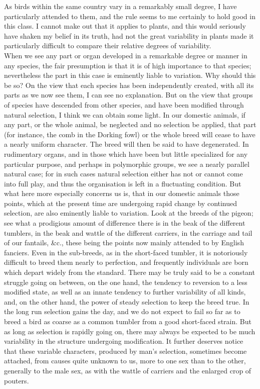 \indent As birds within the same country vary in a remarkably small degree, I have particularly attended to them, and the rule seems to me certainly to hold good in this class. I cannot make out that it applies to plants, and this would seriously have shaken my belief in its truth, had not the great variability in plants made it particularly difficult to compare their relative degrees of variability.\\
\indent When we see any part or organ developed in a remarkable degree or manner in any species, the fair presumption is that it is of high importance to that species; nevertheless the part in this case is eminently liable to variation. Why should this be so? On the view that each species has been independently created, with all its parts as we now see them, I can see no explanation. But on the view that groups of species have descended from other species, and have been modified through natural selection, I think we can obtain some light. In our domestic animals, if any part, or the whole animal, be neglected and no selection be applied, that part (for instance, the comb in the Dorking fowl) or the whole breed will cease to have a nearly uniform character. The breed will then be said to have degenerated. In rudimentary organs, and in those which have been but little specialized for any particular purpose, and perhaps in polymorphic groups, we see a nearly parallel natural case; for in such cases natural selection either has not or cannot come into full play, and thus the organisation is left in a fluctuating condition. But what here more especially concerns us is, that in our domestic animals those points, which at the present time are undergoing rapid change by continued selection, are also eminently liable to variation. Look at the breeds of the pigeon; see what a prodigious amount of difference there is in the beak of the different tumblers, in the beak and wattle of the different carriers, in the carriage and tail of our fantails, \&c., these being the points now mainly attended to by English fanciers. Even in the sub-breeds, as in the short-faced tumbler, it is notoriously difficult to breed them nearly to perfection, and frequently individuals are born which depart widely from the standard. There may be truly said to be a constant struggle going on between, on the one hand, the tendency to reversion to a less modified state, as well as an innate tendency to further variability of all kinds, and, on the other hand, the power of steady selection to keep the breed true. In the long run selection gains the day, and we do not expect to fail so far as to breed a bird as coarse as a common tumbler from a good short-faced strain. But as long as selection is rapidly going on, there may always be expected to be much variability in the structure undergoing modification. It further deserves notice that these variable characters, produced by man's selection, sometimes become attached, from causes quite unknown to us, more to one sex than to the other, generally to the male sex, as with the wattle of carriers and the enlarged crop of pouters.\\
